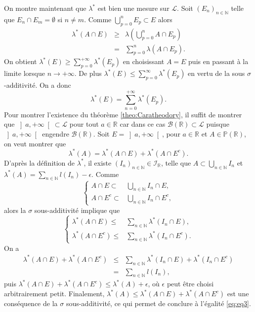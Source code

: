 \documentclass[8pt,notheorems]{beamer}
\def \R{\mathbb R}
\def \N{\mathbb N}
\theoremstyle{definition}
\theoremstyle{example}
\theoremstyle{mystyle}
\theoremstyle{plain}
\begin{document}
\begin{frame}[allowframebreaks]
On montre maintenant que $\lambda^{\ast}$ est bien une mesure sur $\mathcal{L}$. Soit $(E_{n})_{n\in\mathbb{N}}$ telle que $E_n\cap E_m=\emptyset$ si $n\neq m$. Comme $\bigcup_{p=0}^{n}E_p\subset E$ alors
\begin{eqnarray*}
\lambda^{\ast}(A\cap E)&\geq&\lambda\left(\bigcup_{p=0}^{n}A\cap E_p\right)\\
&=&\sum_{p=0}^{n}\lambda(A\cap E_p).
\end{eqnarray*}
On obtient $\lambda^{\ast}(E)\geq \sum_{p=0}^{+\infty}\lambda^{\ast}(E_p)$ en choisissant $A=E$ puis en passant à la limite lorsque $n\rightarrow+\infty$. De plus $\lambda^{\ast}(E)\leq\sum_{p=0}^{\infty}\lambda^{\ast}(E_p)$ en vertu de la sous $\sigma$-additivité. On a donc
$$
\lambda^{\ast}(E)=\sum_{n=0}^{+\infty}\lambda^{\ast}(E_p).
$$
Pour montrer l'existence du théorème \eqref{theo:Caratheodory}, il suffit de montrer que $\left]a,+\infty\right[\subset\mathcal{L}$ pour tout $a\in \mathbb{R}$ car dans ce cas $\mathcal{B}(\mathbb{R})\subset\mathcal{L}$ puisque $\left]a,+\infty\right[$ engendre $\mathcal{B}(\mathbb{R})$. Soit $E=\left]a,+\infty\right[$, pour $a\in\mathbb{R}$ et $A\in\mathbb{P}(\mathbb{R})$, on veut montrer que
\begin{equation}\label{eq:eq3}
\lambda^{\ast}(A)=\lambda^{\ast}(A\cap E)+\lambda^{\ast}(A\cap E^{c}).
\end{equation}
D'après la définition de $\lambda^{\ast}$, il existe $(I_n)_{n\in\N}\in\mathcal{I}_{\R}$, telle que $A\subset\bigcup_{n\in\N}I_n$ et $\lambda^{\ast}(A)=\sum_{n\in\N}l(I_n)-\epsilon$.
Comme
$$
\begin{cases}
A\cap E\subset&\bigcup_{n\in\N}I_n\cap E,\\
A\cap E^{c}\subset&\bigcup_{n\in\N}I_n\cap E^{c},
\end{cases}
$$
alors la $\sigma$ sous-additivité implique que
$$
\begin{cases}
\lambda^{\ast}(A\cap E)\leq&\sum_{n\in\N}\lambda^{\ast}(I_n\cap E),\\
\lambda^{\ast}(A\cap E^{c})\leq&\sum_{n\in\N}\lambda^{\ast}(I_n\cap E^{c}).
\end{cases}
$$
On a
\begin{eqnarray*}
  \lambda^{\ast}(A\cap E)+\lambda^{\ast}(A\cap E^{c})&\leq& \sum_{n\in\mathbb{N}}\lambda^{\ast}(I_n\cap E)+\lambda^{\ast}(I_n\cap E^{c})\\
  &=&\sum_{n\in\N}l(I_n),
\end{eqnarray*}
puis $\lambda^{\ast}(A\cap E)+\lambda^{\ast}(A\cap E^{c})\leq\lambda^{\ast}(A)+\epsilon$, où $\epsilon$ peut être choisi arbitrairement petit. Finalement, $\lambda^{\ast}(A)\leq \lambda^{\ast}(A\cap E)+\lambda^{\ast}(A\cap E^{c})$ est une conséquence de la $\sigma$ sous-additivité, ce qui permet de conclure à l'égalité \eqref{eq:eq3}.\\

\end{frame}
\end{document}
